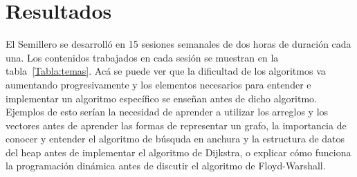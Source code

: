 \documentclass[conference]{IEEEtran}
\begin{document}
\section{Resultados}
El Semillero se desarrolló en 15 sesiones semanales de dos horas de duración cada una. Los contenidos trabajados en cada sesión se muestran en la tabla~\ref{Tabla:temas}. Acá se puede ver que la dificultad de los algoritmos va aumentando progresivamente y los elementos necesarios para entender e implementar un algoritmo específico se enseñan antes de dicho algoritmo. Ejemplos de esto serían la necesidad de aprender a utilizar los arreglos y los vectores antes de aprender las formas de representar un grafo, la importancia de conocer y entender el algoritmo de búsquda en anchura y la estructura de datos del heap antes de implementar el algoritmo de Dijkstra, o explicar cómo funciona la programación dinámica antes de discutir el algoritmo de Floyd-Warshall.
\end{document}

